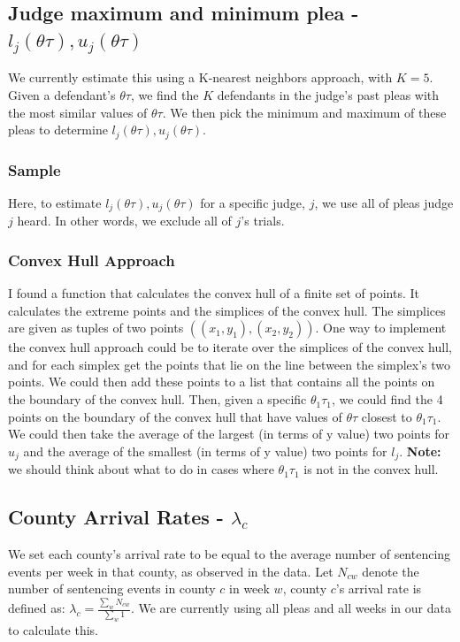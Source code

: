 \documentclass[11pt]{article}
\theoremstyle{ModifiedStyle}
\theoremstyle{ModifiedStyle}
\begin{document}
  \subsection{Judge maximum and minimum plea - $l_j(\theta \tau),u_j(\theta \tau)$}
    We currently estimate this using a K-nearest neighbors approach, with $K=5$. Given a defendant's $\theta \tau$, we find the $K$ defendants in the judge's past pleas with the most similar values of $\theta \tau$. We then pick the minimum and maximum of these pleas to determine $l_j(\theta \tau),u_j(\theta \tau)$.

    \subsubsection{Sample}
      Here, to estimate $l_j(\theta \tau),u_j(\theta \tau)$ for a specific judge, $j$, we use all of pleas judge $j$ heard. In other words, we exclude all of $j$'s trials.

    \subsubsection{Convex Hull Approach}
      I found a function that calculates the convex hull of a finite set of points. It calculates the extreme points and the simplices of the convex hull. The simplices are given as tuples of two points $((x_1,y_1),(x_2,y_2))$. One way to implement the convex hull approach could be to iterate over the simplices of the convex hull, and for each simplex get the points that lie on the line between the simplex's two points. We could then add these points to a list that contains all the points on the boundary of the convex hull. Then, given a specific $\theta_1 \tau_1$, we could find the 4 points on the boundary of the convex hull that have values of $\theta \tau$ closest to $\theta_1 \tau_1$. We could then take the average of the largest (in terms of y value) two points for $u_j$ and the average of the smallest (in terms of y value) two points for $l_j$. \textbf{Note:} we should think about what to do in cases where $\theta_1 \tau_1$ is not in the convex hull.

  \subsection{County Arrival Rates - $\lambda_c$}
    We set each county's arrival rate to be equal to the average number of sentencing events per week in that county, as observed in the data. Let $N_{cw}$ denote the number of sentencing events in county $c$ in week $w$, county $c$'s arrival rate is defined as: $\lambda_c = \frac{\sum_w N_{cw}}{\sum_w 1}$. We are currently using all pleas and all weeks in our data to calculate this.
\end{document}
